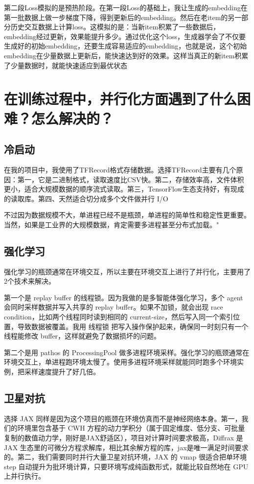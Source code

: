 \documentclass[UTF8]{ctexart}
\begin{document}
第二段Loss模拟的是预热阶段。在第一段Loss的基础上，我让生成的embedding在第一批数据上做一步梯度下降，得到更新后的embedding。然后在老item的另一部分历史交互数据上计算loss。这模拟的是：当新item积累了一些数据后，embedding经过更新，效果能提升多少。通过优化这个loss，生成器学会了不仅要生成好的初始embedding，还要生成容易适应的embedding，也就是说，这个初始embedding在少量数据上更新后，能快速达到好的效果。这样当真正的新item积累了少量数据时，就能快速适应到最优状态


\section{在训练过程中，并行化方面遇到了什么困难？怎么解决的？}
\subsection{冷启动}
在我的项目中，我使用了TFRecord格式存储数据。选择TFRecord主要有几个原因：第一，它是二进制格式，读取速度比CSV快。第二，存储效率高，文件体积更小，适合大规模数据的顺序流式读取。第三，TensorFlow生态支持好，有现成的读取库。第四、天然适合切分成多个文件做并行 I/O

不过因为数据规模不大，单进程已经不是瓶颈，单进程的简单性和稳定性更重要。当然，如果是工业界的大规模数据，肯定需要多进程甚至分布式加载。"
\subsection{强化学习}
强化学习的瓶颈通常在环境交互，所以主要在环境交互上进行了并行化，主要用了2个技术来解决。

第一个是 replay buffer 的线程锁。因为我做的是多智能体强化学习，多个 agent 会同时采样数据并写入共享的 replay buffer。如果不加锁，就会出现 race condition，比如两个线程同时读到相同的 current-size，然后写入同一个索引位置，导致数据被覆盖。我用 线程锁 把写入操作保护起来，确保同一时刻只有一个线程能修改 buffer，这样就避免了数据损坏的问题。

第二个是用 pathos 的 ProcessingPool 做多进程环境采样。强化学习的瓶颈通常在环境交互上，单进程跑环境太慢了。使用多进程环境采样就能同时跑多个环境实例，把采样速度提升了好几倍。
\subsection{卫星对抗}
选择 JAX 同样是因为这个项目的瓶颈在环境仿真而不是神经网络本身。第一，我们的环境里包含基于 CWH 方程的动力学积分（属于固定维度、低分支、可批量复制的数值动力学，刚好是JAX舒适区），项目对计算时间要求极高，Diffrax 是 JAX 生态里的可微分方程求解库，相比其余解方程的库，jax是唯一满足时间要求的。第二，我们需要同时并行大量卫星对抗环境，JAX 的 vmap 很适合把单环境 step 自动提升为批环境计算，只要环境写成纯函数形式，就能比较自然地在 GPU 上并行执行。
\end{document}
